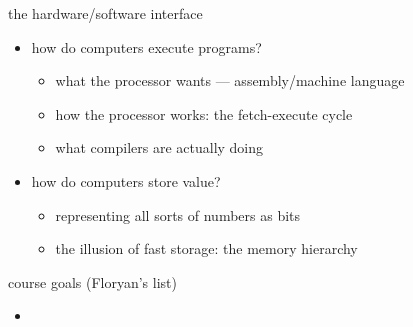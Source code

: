 
\begin{frame}{the hardware/software interface}
\begin{itemize}
\item how do computers execute programs?
    \begin{itemize}
    \item what the processor wants --- assembly/machine language
    \item how the processor works: the fetch-execute cycle
    \item what compilers are actually doing
    \end{itemize}
\item how do computers store value?
    \begin{itemize}
    \item representing all sorts of numbers as bits
    \item the illusion of fast storage: the memory hierarchy
    \end{itemize}
\end{itemize}
\end{frame}

\begin{frame}{course goals (Floryan's list)}
\begin{itemize}
\item 
\end{itemize}
\end{frame}
